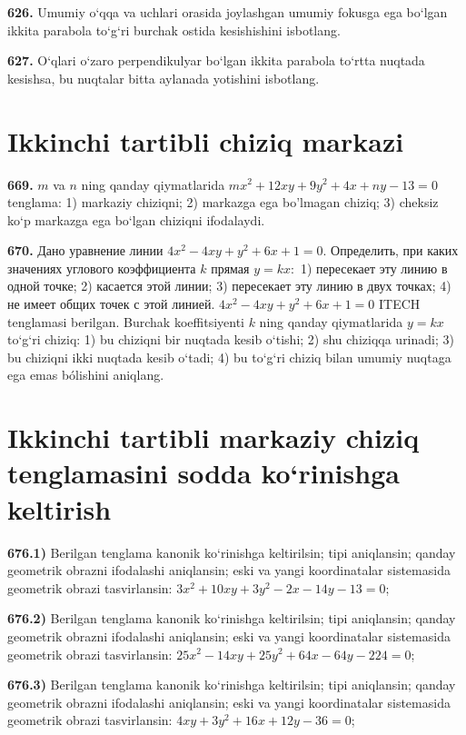 \textbf{626.} Umumiy o‘qqa va uchlari orasida joylashgan umumiy fokusga ega bo‘lgan ikkita parabola to‘g‘ri burchak ostida kesishishini isbotlang.

\textbf{627.} O‘qlari o‘zaro perpendikulyar bo‘lgan ikkita parabola to‘rtta nuqtada kesishsa, bu nuqtalar bitta aylanada yotishini isbotlang.



\section{ Ikkinchi tartibli chiziq markazi }



\textbf{669.} $m$ va $n$ ning qanday qiymatlarida $m x^2+12 x y+9 y^2+4 x+n y-13=0$ tenglama: 1) markaziy chiziqni; 2) markazga ega bo'lmagan chiziq; 3) cheksiz ko‘p markazga ega bo‘lgan chiziqni ifodalaydi.

\textbf{670.} Дано уравнение линии $4 x^2-4 x y+y^2+6 x+1=0$. Определить, при каких значениях углового коэффициента $k$ прямая $y=k x:$ 1) пересекает эту линию в одной точке; 2) касается этой линии; 3) пересекает эту линию в двух точках; 4) не имеет общих точек с этой линией.
$4 x^2-4 x y+y^2+6 x+1=0$ ITECH tenglamasi berilgan. Burchak koeffitsiyenti $k$ ning qanday qiymatlarida $y=kx$ to‘g‘ri chiziq: 1) bu chiziqni bir nuqtada kesib o‘tishi; 2) shu chiziqqa urinadi; 3) bu chiziqni ikki nuqtada kesib o‘tadi; 4) bu to‘g‘ri chiziq bilan umumiy nuqtaga ega emas bólishini aniqlang.



\section{Ikkinchi tartibli markaziy chiziq tenglamasini sodda ko‘rinishga keltirish}



\textbf{676.1)} Berilgan tenglama kanonik ko‘rinishga keltirilsin; tipi aniqlansin; qanday geometrik obrazni ifodalashi aniqlansin; eski va yangi koordinatalar sistemasida geometrik obrazi tasvirlansin: $3 x^2+10 x y+3 y^2-2 x-14 y-13=0$;

\textbf{676.2)} Berilgan tenglama kanonik ko‘rinishga keltirilsin; tipi aniqlansin; qanday geometrik obrazni ifodalashi aniqlansin; eski va yangi koordinatalar sistemasida geometrik obrazi tasvirlansin: $25 x^2-14 x y+25 y^2+64 x-64 y-224=0$;

\textbf{676.3)} Berilgan tenglama kanonik ko‘rinishga keltirilsin; tipi aniqlansin; qanday geometrik obrazni ifodalashi aniqlansin; eski va yangi koordinatalar sistemasida geometrik obrazi tasvirlansin: $4 x y+3 y^2+16 x+12 y-36=0$;


